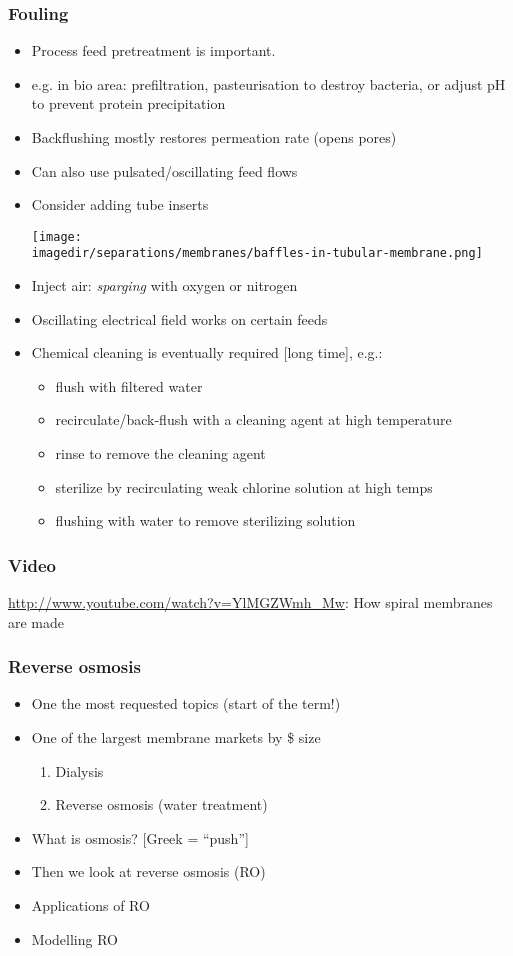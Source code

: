 \begin{frame}\frametitle{Fouling}
	\begin{itemize}
		\item	Process feed pretreatment is important. 
		\item	e.g. in bio area: prefiltration, pasteurisation to destroy bacteria, or adjust pH to prevent protein precipitation
		\item	Backflushing mostly restores permeation rate (opens pores)
		\item	Can also use pulsated/oscillating feed flows
		\item	Consider adding tube inserts

			\texttt{[image: \\imagedir/separations/membranes/baffles-in-tubular-membrane.png]}

		\item	Inject air: \emph{sparging} with oxygen or nitrogen
		\item	Oscillating electrical field works on certain feeds
		\item	Chemical cleaning is eventually required [long time], e.g.:
		\begin{itemize}
			\item	flush with filtered water 
			\item	recirculate/back-flush with a cleaning agent at high temperature
			\item	rinse to remove the cleaning agent
			\item	sterilize by recirculating weak chlorine solution at high temps
			\item	flushing with water to remove sterilizing solution
		\end{itemize}
	\end{itemize}	
\end{frame}

\begin{frame}\frametitle{Video}
	\href{http://www.youtube.com/watch?v=YlMGZWmh\_Mw}{http://www.youtube.com/watch?v=YlMGZWmh\_Mw}: How spiral membranes are made
\end{frame}

\begin{frame}\frametitle{Reverse osmosis}
	\begin{itemize}
		\item	One the most requested topics (start of the term!)
		\item	One of the largest membrane markets by \$ size
			\begin{enumerate}
				\item	Dialysis
				\item	Reverse osmosis (water treatment)
			\end{enumerate}
		\item	What is osmosis? [Greek = ``push'']
		\item	Then we look at reverse osmosis (RO)
		\item	Applications of RO
		\item	Modelling RO
	\end{itemize}
\end{frame}


